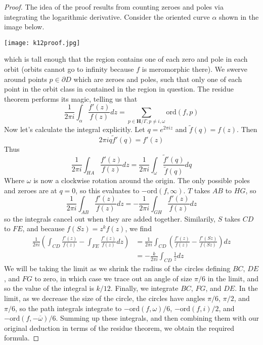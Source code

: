 \begin{proof}
    The idea of the proof results from counting zeroes and poles via integrating the logarithmic derivative. Consider the oriented curve $\alpha$ shown in the image below.
    \begin{center}
    \texttt{[image: k12proof.jpg]}
    \end{center}
    which is tall enough that the region contains one of each zero and pole in each orbit (orbits cannot go to infinity because $f$ is meromorphic there). We swerve around points $p \in \partial D$ which are zeroes and poles, such that only one of each point in the orbit class in contained in the region in question. The residue theorem performs its magic, telling us that
    \[ \frac{1}{2\pi i} \int_\alpha \frac{f'(z)}{f(z)} dz = \sum_{p \in \mathbf{H}/\Gamma, p \neq i, \omega} \text{ord}(f,p) \]
    Now let's calculate the integral explicitly. Let $q = e^{2 \pi i z}$ and $\tilde{f}(q) = f(z)$. Then
    \[ 2 \pi i q \tilde{f}'(q) = f'(z)  \]
    Thus
    \[ \frac{1}{2 \pi i} \int_{HA} \frac{f'(z)}{f(z)} dz = \frac{1}{2 \pi i} \int_{\omega} \frac{\tilde{f}'(q)}{\tilde{f}(q)} dq \]
    Where $\omega$ is now a clockwise rotation around the origin. The only possible poles and zeroes are at $q = 0$, so this evaluates to $- \text{ord}(f,\infty)$. $T$ takes $AB$ to $HG$, so
    \[ \frac{1}{2 \pi i} \int_{AB} \frac{f'(z)}{f(z)} dz = - \frac{1}{2 \pi i} \int_{GH} \frac{f'(z)}{f(z)} dz \]
    so the integrals cancel out when they are added together. Similarily, $S$ takes $CD$ to $FE$, and because $f(Sz) = z^k f(z)$, we find
    \begin{align*}
        \frac{1}{2 \pi i} \left( \int_{CD} \frac{f'(z)}{f(z)} - \int_{FE} \frac{f'(z)}{f(z)} dz \right) &= \frac{1}{2 \pi i} \int_{CD} \left( \frac{f'(z)}{f(z)} - \frac{f'(Sz)}{f(Sz)} \right) dz\\
        &= -\frac{k}{2 \pi i} \int_{CD} \frac{1}{z} dz
    \end{align*}
    We will be taking the limit as we shrink the radius of the circles defining $BC$, $DE$, and $FG$ to zero, in which case we trace out an angle of size $\pi/6$ in the limit, and so the value of the integral is $k/12$. Finally, we integrate $BC$, $FG$, and $DE$. In the limit, as we decrease the size of the circle, the circles have angles $\pi/6$, $\pi/2$, and $\pi/6$, so the path integrals integrate to $- \text{ord}(f,\omega)/6$, $- \text{ord}(f,i)/2$, and $- \text{ord}(f, -\overline{\omega})/6$. Summing up these integrals, and then combining them with our original deduction in terms of the residue theorem, we obtain the required formula.
\end{proof}

